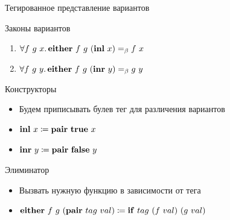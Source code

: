     \begin{frame}[fragile]{Тегированное представление вариантов}
        \begin{block}{Законы вариантов}
            \begin{enumerate}
                \item $\forall f~g~x \ldotp \mathbf{either} ~ f ~ g ~ (\mathbf{inl} ~ x) =_\beta f ~ x$
                \item $\forall f~g~y \ldotp \mathbf{either} ~ f ~ g ~ (\mathbf{inr} ~ y) =_\beta g ~ y$
            \end{enumerate}
        \end{block}
        \pause
        \begin{block}{Конструкторы}
            \begin{itemize}
                \item Будем приписывать булев тег для различения вариантов
                \item $\mathbf{inl} ~ x \coloneqq \mathbf{pair} ~ \mathbf{true} ~ x$
                \item $\mathbf{inr} ~ y \coloneqq \mathbf{pair} ~ \mathbf{false} ~ y$
            \end{itemize}
        \end{block}
        \pause
        \begin{block}{Элиминатор}
            \begin{itemize}
                \item Вызвать нужную функцию в зависимости от тега
                \item $\mathbf{either} ~ f ~ g ~ (\mathbf{pair} ~ tag ~ val) \coloneqq \mathbf{if} ~ tag ~ (f ~ val) ~ (g ~ val)$
            \end{itemize}
        \end{block}
    \end{frame}

